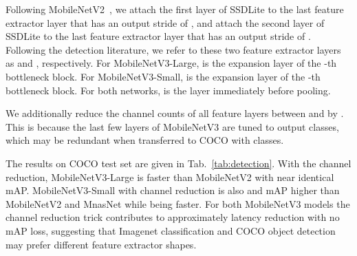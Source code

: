 \documentclass[10pt,twocolumn,letterpaper]{article}
\begin{document}
Following MobileNetV2~\cite{mobilenetv2}, we attach the first layer of SSDLite to the last feature extractor layer that has an output stride of , and attach the second layer of SSDLite to the last feature extractor layer that has an output stride of . Following the detection literature, we refer to these two feature extractor layers as  and , respectively. For MobileNetV3-Large,  is the expansion layer of the -th bottleneck block. For MobileNetV3-Small,  is the expansion layer of the -th bottleneck block. For both networks,  is the layer immediately before pooling.

We additionally reduce the channel counts of all feature layers between  and  by . This is because the last few layers of MobileNetV3 are tuned to output  classes, which may be redundant when transferred to COCO with  classes. 

The results on COCO test set are given in Tab.~\ref{tab:detection}. With the channel reduction, MobileNetV3-Large is  faster than MobileNetV2 with near identical mAP. MobileNetV3-Small with channel reduction is also  and  mAP higher than MobileNetV2 and MnasNet while being  faster. For both MobileNetV3 models the channel reduction trick contributes to approximately  latency reduction with no mAP loss, suggesting that Imagenet classification and COCO object detection may prefer different feature extractor shapes.


\begin{table}[t]
\centering
{}
\caption{Object detection results of SSDLite with different backbones on COCO test set. : Channels in the blocks between  and  are reduced by a factor of 2.}
\label{tab:detection}
\end{table}
\end{document}
